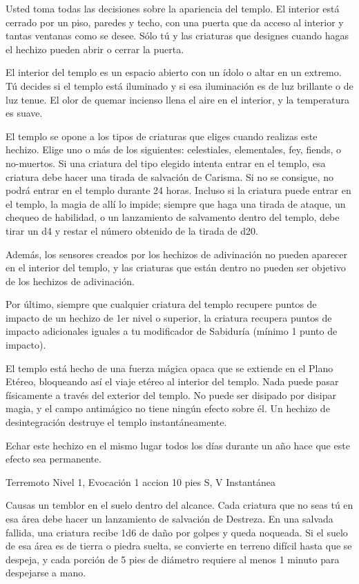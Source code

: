 \documentclass[a4paper,twocolumn,openany,10pt]{dndbook}
\begin{document}
	Usted toma todas las decisiones sobre la apariencia del templo. El interior está cerrado por un piso, paredes y techo, con
	una puerta que da acceso al interior y tantas ventanas como se desee. Sólo tú y las criaturas que designes cuando hagas el
	hechizo pueden abrir o cerrar la puerta.
	
	El interior del templo es un espacio abierto con un ídolo o altar en un extremo. Tú decides si el templo está iluminado y si
	esa iluminación es de luz brillante o de luz tenue. El olor de quemar incienso llena el aire en el interior, y la
	temperatura es suave.
	
	El templo se opone a los tipos de criaturas que eliges cuando realizas este hechizo. Elige uno o más de los siguientes:
	celestiales, elementales, fey, fiends, o no-muertos. Si una criatura del tipo elegido intenta entrar en el templo, esa
	criatura debe hacer una tirada de salvación de Carisma. Si no se consigue, no podrá entrar en el templo durante 24 horas.
	Incluso si la criatura puede entrar en el templo, la magia de allí lo impide; siempre que haga una tirada de ataque, un
	chequeo de habilidad, o un lanzamiento de salvamento dentro del templo, debe tirar un d4 y restar el número obtenido de la
	tirada de d20.
	
	Además, los sensores creados por los hechizos de adivinación no pueden aparecer en el interior del templo, y las criaturas
	que están dentro no pueden ser objetivo de los hechizos de adivinación.
	
	Por último, siempre que cualquier criatura del templo recupere puntos de impacto de un hechizo de 1er nivel o superior, la
	criatura recupera puntos de impacto adicionales iguales a tu modificador de Sabiduría (mínimo 1 punto de impacto).
	
	El templo está hecho de una fuerza mágica opaca que se extiende en el Plano Etéreo, bloqueando así el viaje etéreo al
	interior del templo. Nada puede pasar físicamente a través del exterior del templo. No puede ser disipado por disipar magia,
	y el campo antimágico no tiene ningún efecto sobre él. Un hechizo de desintegración destruye el templo instantáneamente.
	
	Echar este hechizo en el mismo lugar todos los días durante un año hace que este efecto sea permanente. 

\spellheader%
	{Terremoto}
	{Nivel 1, Evocación}
	{1 accion}
	{10 pies}
	{S, V}
	{Instantánea}
	
	Causas un temblor en el suelo dentro del alcance. Cada criatura que no seas tú en esa área debe hacer un lanzamiento de
	salvación de Destreza. En una salvada fallida, una criatura recibe 1d6 de daño por golpes y queda noqueada. Si el suelo de
	esa área es de tierra o piedra suelta, se convierte en terreno difícil hasta que se despeja, y cada porción de 5 pies de
	diámetro requiere al menos 1 minuto para despejarse a mano.
\end{document}
